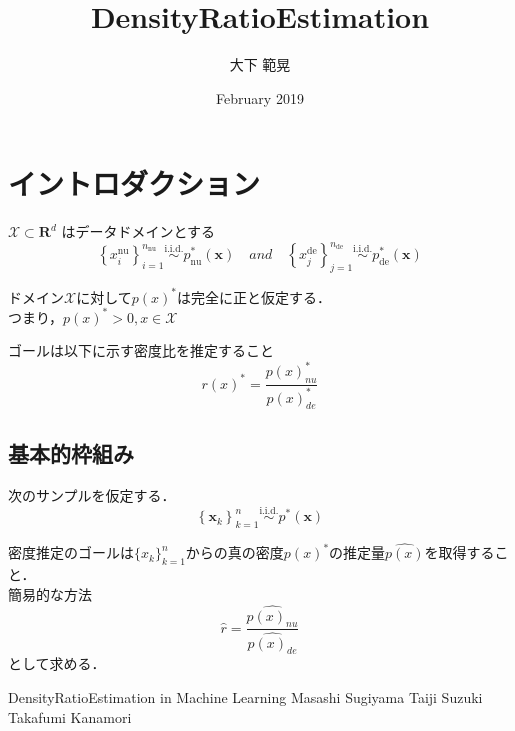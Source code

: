 \documentclass{article}
\title{DensityRatioEstimation}
\author{大下 範晃}
\date{February 2019}
\begin{document}
\maketitle

\section{イントロダクション}

$\mathcal{X} \subset \mathbf{R}^d $ はデータドメインとする
\begin{equation}
    \left\{ x _ { i } ^ { \mathrm { nu } } \right\} _ { i = 1 } ^ { n _ { \mathrm { nu } } } \stackrel { \mathrm { i.i.d. } } { \sim } p _ { \mathrm { nu } } ^ { * } ( \boldsymbol { x } ) \quad and \quad \left\{ x _ { j } ^ { \mathrm { de } } \right\} _ { j = 1 } ^ { n _ { \mathrm { de } } } \stackrel { \mathrm { i.i.d. } } { \sim } p _ { \mathrm { de } } ^ { * } ( \boldsymbol { x } )
\end{equation}

ドメイン$\mathcal{X}$に対して$p(x)^*$は完全に正と仮定する．\\
つまり，$p(x)^* > 0, x \in \mathcal{X}$

ゴールは以下に示す密度比を推定すること\\
\begin{equation}
    r(x)^* = \frac{p(x)^*_{nu}}{p(x)^*_{de}}
\end{equation}

\subsection{基本的枠組み}

次のサンプルを仮定する．
\begin{equation}
    \left\{ \boldsymbol { x } _ { k } \right\} _ { k = 1 } ^ { n } \stackrel { \mathrm { i.i.d. } } { \sim } p ^ { * } ( \boldsymbol { x } )
\end{equation}

密度推定のゴールは$\{x_k\}_{k=1}^n$からの真の密度$p(x)^*$の推定量$\hat{p(x)}$を取得すること．\\

簡易的な方法\\
\begin{equation}
    \hat{r} = \frac{\hat{p(x)_{nu}}}{\hat{p(x)_{de}}}
\end{equation}
として求める．

\begin{thebibliography}{99}
\item
DensityRatioEstimation in Machine Learning
Masashi Sugiyama Taiji Suzuki Takafumi Kanamori
\end{thebibliography}
\end{document}
